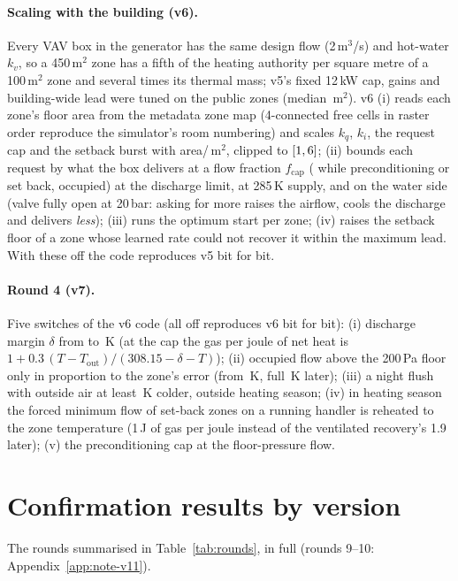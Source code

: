 \documentclass{article}
\begin{document}
\paragraph{Scaling with the building (v6).}
Every VAV box in the generator has the same design flow (2\,m$^3$/s) and hot-water $k_v$, so
a 450\,m$^2$ zone has a fifth of the heating authority per square metre of a 100\,m$^2$ zone
and several times its thermal mass; v5's fixed 12\,kW cap, gains and building-wide lead were
tuned on the public zones (median \PubZoneAreaMedian\,m$^2$). v6 (i) reads each zone's floor
area from the metadata zone map (4-connected free cells in raster order reproduce the
simulator's room numbering) and scales $k_q$, $k_i$, the request cap and the setback burst with
area/\ParAreaRef\,m$^2$, clipped to $[1, 6]$; (ii) bounds each
request by what the box delivers at a flow fraction $f_{\text{cap}}$ (\VSixFCapPre{} while
preconditioning or set back, \ParFCapOcc{} occupied) at the discharge limit, at 285\,K supply,
and on the water side (valve fully open at 20\,bar: asking for more raises the airflow, cools
the discharge and delivers \emph{less}); (iii) runs the optimum start per zone; (iv) raises the
setback floor of a zone whose learned rate could not recover it within the maximum lead. With
these off the code reproduces v5 bit for bit.

\paragraph{Round 4 (v7).}
\label{sec:v7}
Five switches of the v6 code (all off reproduces v6 bit for bit): (i) discharge margin $\delta$ from
\VSixDischMargin{} to \ParRFDischMargin\,K (at the cap the gas per joule of net heat is
$1 + 0.3\,(T - T_{\text{out}})/(308.15 - \delta - T)$); (ii) occupied flow above the 200\,Pa floor only in
proportion to the zone's error (from \ParRFOccEzero\,K, full \ParRFOccSpan\,K later); (iii) a night flush with
outside air at least \ParRFFlushDt\,K colder, outside heating season; (iv) in heating season the forced minimum
flow of set-back zones on a running handler is reheated to the zone temperature (1\,J of gas per joule instead
of the ventilated recovery's 1.9 later); (v) the preconditioning cap at the floor-pressure flow.

\section{Confirmation results by version}
\label{app:rounds}
The rounds summarised in Table~\ref{tab:rounds}, in full (rounds 9--10: Appendix~\ref{app:note-v11}).
\end{document}
